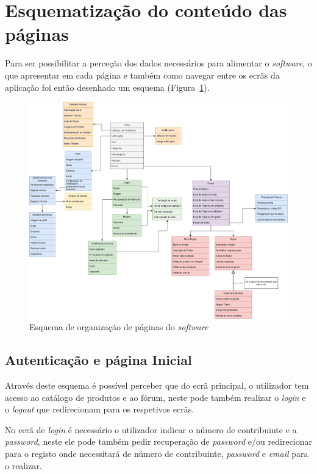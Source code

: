 \section{Esquematização do conteúdo das páginas}

Para ser possibilitar a perceção dos dados necessários para alimentar o \textit{software}, o que apresentar em cada página e também como navegar entre os ecrãs da aplicação foi então desenhado um esquema 
(Figura~\ref{fig:3}).

\begin{figure}[htb]
    \centering
    
    \includegraphics[width=\textwidth]{images/Arquiteturas/diagrama_superficial_de_aplicacao.png}
    \caption{Esquema de organização de páginas do \textit{software}}
    \label{fig:3}
\end{figure}

\newpage

\subsection{Autenticação e página Inicial}

Através deste esquema é possível perceber que do ecrã principal, o utilizador tem acesso ao 
catálogo de produtos e ao fórum, neste pode também realizar o \textit{login} e o \textit{logout} que redirecionam para os respetivos ecrãs.

No ecrã de \textit{login} é necessário o utilizador indicar o número de contribuinte e a \textit{\textit{password}}, neste ele pode também pedir recuperação de \textit{\textit{password}} e/ou redirecionar para o registo onde necessitará de número de contribuinte, \textit{\textit{password}} e \textit{email} para o realizar.

